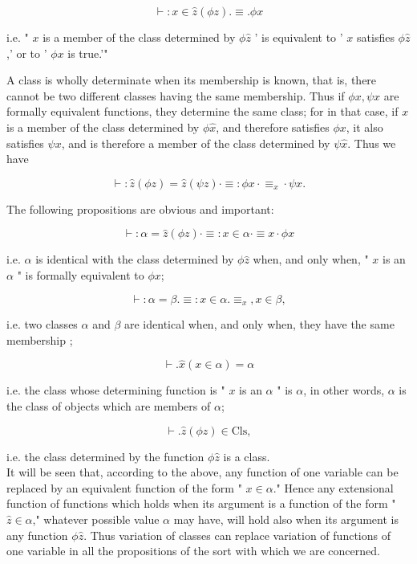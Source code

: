 \documentclass[10pt]{article}
\begin{document}
$$
\vdash: x \in \hat{z}(\phi z) . \equiv . \phi x
$$

i.e. " $x$ is a member of the class determined by $\phi \hat{z}$ ' is equivalent to ' $x$ satisfies $\phi \hat{z}$,' or to ' $\phi x$ is true.'"

A class is wholly determinate when its membership is known, that is, there cannot be two different classes having the same membership. Thus if $\phi x, \psi x$ are formally equivalent functions, they determine the same class; for in that case, if $x$ is a member of the class determined by $\phi \hat{x}$, and therefore satisfies $\phi x$, it also satisfies $\psi x$, and is therefore a member of the class determined by $\psi \hat{x}$. Thus we have

$$
\vdash: \hat{z}(\phi z)=\hat{z}(\psi z) \cdot \equiv: \phi x \cdot \equiv_{x} \cdot \psi x .
$$

The following propositions are obvious and important:

$$
\vdash: \alpha=\hat{z}(\phi z) \cdot \equiv: x \in \alpha \cdot \equiv x \cdot \phi x
$$

i.e. $\alpha$ is identical with the class determined by $\phi \hat{z}$ when, and only when, " $x$ is an $\alpha$ " is formally equivalent to $\phi x$;

$$
\vdash: \alpha=\beta . \equiv: x \in \alpha . \equiv_{x}, x \in \beta,
$$

i.e. two classes $\alpha$ and $\beta$ are identical when, and only when, they have the same membership ;

$$
\vdash . \hat{x}(x \in \alpha)=\alpha
$$

i.e. the class whose determining function is " $x$ is an $\alpha$ " is $\alpha$, in other words, $\alpha$ is the class of objects which are members of $\alpha$;

$$
\vdash . \hat{z}(\phi z) \in \mathrm{Cls},
$$

i.e. the class determined by the function $\phi \hat{z}$ is a class.\\
It will be seen that, according to the above, any function of one variable can be replaced by an equivalent function of the form " $x \in \alpha$." Hence any extensional function of functions which holds when its argument is a function of the form " $\hat{z} \in \alpha$," whatever possible value $\alpha$ may have, will hold also when its argument is any function $\phi \hat{z}$. Thus variation of classes can replace variation of functions of one variable in all the propositions of the sort with which we are concerned.
\end{document}
